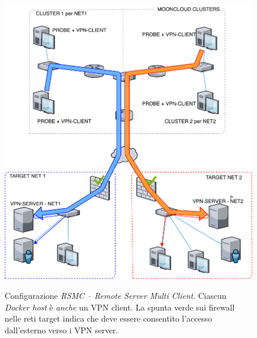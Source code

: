 \begin{figure}[h!]
	\includegraphics[scale=0.55]{img/rsmc}
	\label{fig:rsmc}
	\caption[Configurazione \textit{RSMC -- Remote Server Multi Client}]{Configurazione
		\textit{RSMC -- Remote Server Multi Client}. Ciascun \textit{Docker host} è \textit{anche} un VPN client.
		La spunta verde sui firewall nelle reti target indica che deve essere consentito l'accesso
	dall'esterno verso i VPN server.}
\end{figure}


